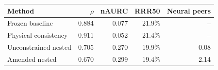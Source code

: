 \begin{tabular}{lrrrr}
\toprule
Method & $\rho$ & nAURC & RRR50 & Neural peers \\
\midrule
Frozen baseline & 0.884 & 0.077 & 21.9\% & -- \\
Physical consistency & 0.911 & 0.052 & 21.4\% & -- \\
Unconstrained nested & 0.705 & 0.270 & 19.9\% & 0.08 \\
Amended nested & 0.670 & 0.299 & 19.4\% & 2.14 \\
\bottomrule
\end{tabular}
